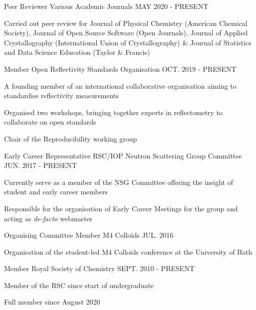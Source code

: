 \begin{cventries}
  \cventry
    {Peer Reviewer}
    {Various Academic Journals}
    {}
    {MAY 2020 - PRESENT}
    {
        \begin{cvitems}
            \item{Carried out peer review for Journal of Physical Chemistry (American Chemical Society), Journal of Open Source Software (Open Journals), Journal of Applied Crystallography (International Union of Crystallography) \& Journal of Statistics and Data Science Education (Taylor \& Francis)}
        \end{cvitems}
    }
  \cventry
    {Member}
    {Open Reflectivity Standards Organisation}
    {}
    {OCT. 2019 - PRESENT}
    {
      \begin {cvitems}
        \item {A founding member of an international collaborative organisation aiming to standardise reflectivity measurements}
        \item {Organised two workshops, bringing together experts in reflectometry to collaborate on open standards}
        \item {Chair of the Reproducibility working group}
      \end {cvitems}
    }
  \cventry
  	{Early Career Representative}
    {RSC/IOP Neutron Scattering Group Committee}
    {}
    {JUN. 2017 - PRESENT}
    {
      \begin{cvitems}
      	\item{Currently serve as a member of the NSG Committee offering the insight of student and early career members}
      	\item{Responsible for the organisation of Early Career Meetings for the group and acting as \emph{de-facto} webmaster}
	  \end{cvitems}
	}
  \cventry
    {Organising Committee Member}
    {M4 Colloids}
    {}
    {JUL. 2016}
    {
      \begin{cvitems}
        \item{Organisation of the student-led M4 Colloids conference at the University of Bath}
      \end{cvitems}
    }
  \cventry
    {Member}
    {Royal Society of Chemistry}
    {}
    {SEPT. 2010 - PRESENT}
    {
      \begin{cvitems}
      	\item{Member of the RSC since start of undergraduate}
      	\item{Full member since August 2020}
      \end{cvitems}
    }
\end{cventries}
